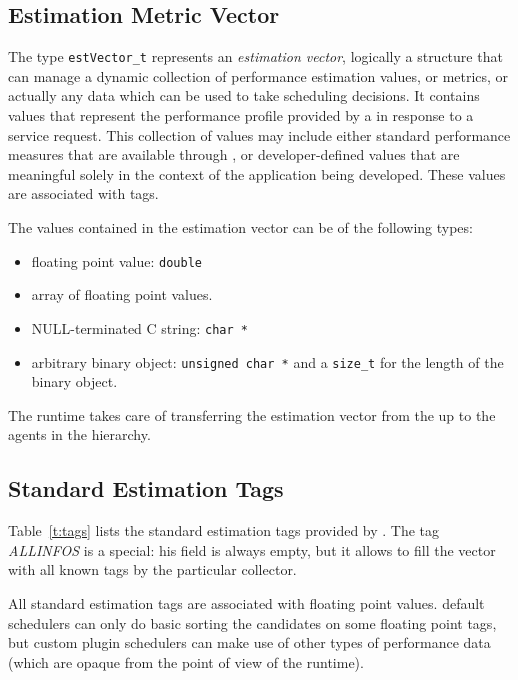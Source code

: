 
\subsection{Estimation Metric Vector}\label{sect:estvector}

The type \texttt{estVector\_t} represents an \emph{estimation vector},
logically a structure that can manage a dynamic collection of performance
estimation values, or metrics, or actually any data which can be used to take
scheduling decisions. It contains values that represent the performance profile
provided by a {\sed} in response to a \diet service request. This collection of
values may include either standard performance measures that are available
through \diet, or developer-defined values that are meaningful solely in the
context of the application being developed. These values are associated with
tags.

The values contained in the estimation vector can be of the following types:
\begin{itemize}
\item floating point value: \verb+double+
\item array of floating point values.
\item NULL-terminated C string: \verb+char *+
\item arbitrary binary object: \verb+unsigned char *+ and a \verb+size_t+ for
  the length of the binary object.
\end{itemize}

The \diet runtime takes care of transferring the estimation vector from the
\sed up to the agents in the hierarchy.

\subsection{Standard Estimation Tags}\label{sect:estTags}

Table~\ref{t:tags} lists the standard estimation tags provided by \diet. The
tag \textit{ALLINFOS} is a special: his field is always empty, but it allows to
fill the vector with all known tags by the particular collector.

All standard estimation tags are associated with floating point values. \diet
default schedulers can only do basic sorting the candidates \sed on some
floating point tags, but custom plugin schedulers can make use of other types
of performance data (which are opaque from the point of view of the \diet
runtime).

